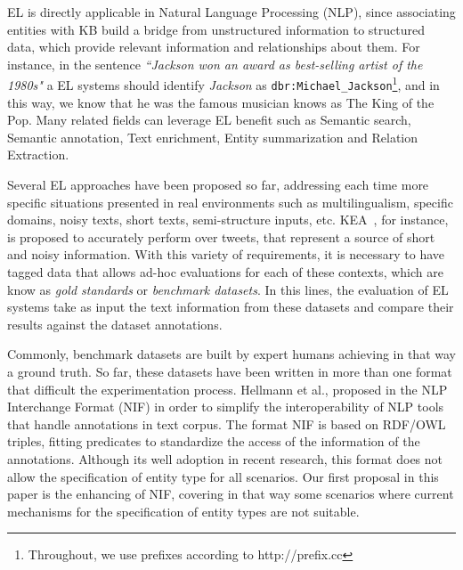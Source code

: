 \documentclass{llncs}
\begin{document}
EL is directly applicable in Natural Language Processing (NLP), since associating entities with KB build a bridge from unstructured information to structured data, which provide relevant information and relationships about them. For instance, in the sentence \textit{``Jackson won an award as best-selling artist of the 1980s"} a EL systems should identify \textit{Jackson} as \texttt{dbr:Michael\_Jackson}\footnote{Throughout, we use prefixes according to http://prefix.cc}, and in this way, we know that he was the famous musician knows as The King of the Pop. Many related fields can leverage EL benefit such as Semantic search, Semantic annotation, Text enrichment, Entity summarization and Relation Extraction. 

Several EL approaches have been proposed so far, addressing each time more specific situations presented in real environments such as multilingualism, specific domains, noisy texts, short texts, semi-structure inputs, etc. KEA~\cite{KEA2016}, for instance, is proposed to accurately perform over tweets, that represent a source of short and noisy information. With this variety of requirements, it is necessary to have tagged data that allows ad-hoc evaluations for each of these contexts, which are know as \textit{gold standards} or \textit{benchmark datasets}. In this lines, the evaluation of EL systems take as input the text information from these datasets and compare their results against the dataset annotations. 

Commonly, benchmark datasets are built by expert humans achieving in that way a ground truth. So far, these datasets have been written in more than one format that difficult the experimentation process. Hellmann et al., proposed in \cite{NIFpaper} the NLP Interchange Format (NIF) in order to simplify the interoperability of NLP tools that handle annotations in text corpus. The format NIF is based on RDF/OWL triples, fitting predicates to standardize the access of the information of the annotations. Although its well adoption in recent research, this format does not allow the specification of entity type for all scenarios. Our first proposal in this paper is the enhancing of NIF, covering in that way some scenarios where current mechanisms for the specification of entity types are not suitable.
\end{document}
